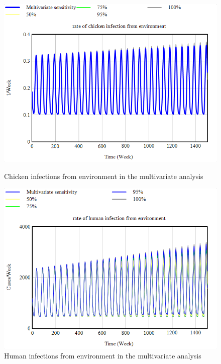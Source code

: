 \begin{figure}[h!]
    \centering
    \begin{minipage}{0.45\textwidth}
        \centering
        \includegraphics[width=1\textwidth]{images/sensitivity/Multivariate chicken infection.png} 
        \caption{Chicken infections from environment in the multivariate analysis}
        \label{fig:multi_chicken}
    \end{minipage}\hfill
    \begin{minipage}{0.45\textwidth}
        \centering
        \includegraphics[width=1\textwidth]{images/sensitivity/Multivariate human infection.png}
        \caption{Human infections from environment in the multivariate analysis}
        \label{fig:multi_human}
    \end{minipage}
\end{figure}


